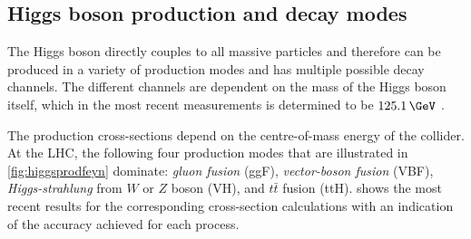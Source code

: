 \subsection{Higgs boson production and decay modes}
\label{sec:higgschannels}
The Higgs boson directly couples to all massive particles and therefore can be produced in a variety of production modes and has multiple possible decay channels.
The different channels are dependent on the mass of the Higgs boson itself, which in the most recent measurements is determined to be $125.1\,\GeV$ . 

The production cross-sections depend on the centre-of-mass energy of the collider. 
At the LHC, the following four production modes that are illustrated in \cref{fig:higgsprodfeyn} dominate: \emph{gluon fusion} (ggF), \emph{vector-boson fusion} (VBF), \emph{Higgs-strahlung} from $W$ or $Z$ boson (VH), and $t\bar{t}$ fusion (ttH).
 shows the most recent results for the corresponding cross-section calculations with an indication of the accuracy achieved for each process.

